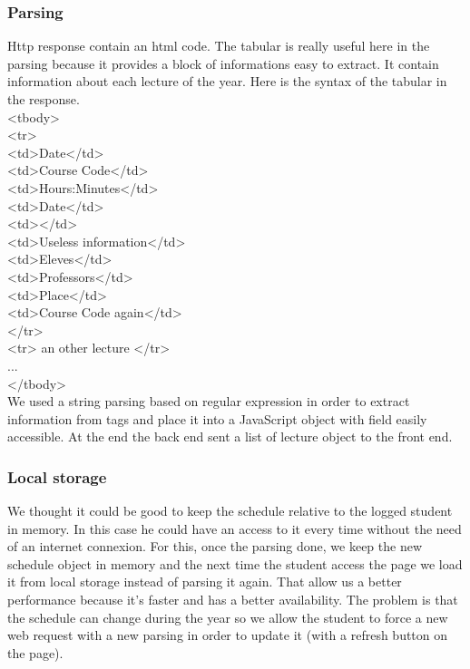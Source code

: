 \documentclass{eplmastersthesis}
\newcommand\tab[1][0.5cm]{\hspace*{#1}}
\begin{document}
\subsubsection{Parsing}
Http response contain an html code. The tabular is really useful here in the parsing because it provides a block of informations easy to extract. It contain information about each lecture of the year. Here is the syntax of the tabular in the response.\\
<tbody>\\
\tab <tr>\\
\tab \tab <td>Date</td>\\
\tab \tab <td>Course Code</td>\\
\tab \tab <td>Hours:Minutes</td>\\
\tab \tab <td>Date</td>\\
\tab \tab <td></td>\\
\tab \tab <td>Useless information</td>\\
\tab \tab <td>Eleves</td>\\
\tab \tab <td>Professors</td>\\
\tab \tab <td>Place</td>\\
\tab \tab <td>Course Code again</td>\\
\tab </tr>\\
\tab <tr> an other lecture </tr>\\
\tab ...\\
</tbody>\\
We used a string parsing based on regular expression in order to extract information from tags and place it into a JavaScript object with field easily accessible. At the end the back end sent a list of lecture object to the front end.

\subsubsection{Local storage}
We thought it could be good to keep the schedule relative to the logged student in memory. In this case he could have an access to it every time without the need of an internet connexion. For this, once the parsing done, we keep the new schedule object in memory and the next time the student access the page we load it from local storage instead of parsing it again. That allow us a better performance because it's faster and has a better availability. The problem is that the schedule can change during the year so we allow the student to force a new web request with a new parsing in order to update it (with a refresh button on the page).
\end{document}
